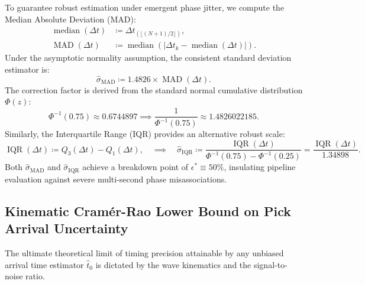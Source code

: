 To guarantee robust estimation under emergent phase jitter, we compute the
Median Absolute Deviation (\ac{MAD}):
\begin{align}
  \operatorname{median}(\Delta t)
  &\coloneqq \Delta t_{(\lfloor (N+1)/2 \rfloor)},
  \label{eq:supp_median} \\
  \operatorname{MAD}(\Delta t)
  &\coloneqq \operatorname{median}\left(\left| \Delta t_k -
  \operatorname{median}(\Delta t) \right|\right).
  \label{eq:supp_mad}
\end{align}
Under the asymptotic normality assumption, the consistent standard
deviation estimator is:
\begin{equation}
  \hat{\sigma}_{\mathrm{MAD}} \coloneqq \num{1.4826} \times
  \operatorname{MAD}(\Delta t).
  \label{eq:supp_sigma_mad}
\end{equation}
The correction factor is derived from the standard normal cumulative
distribution $\Phi(z)$:
\begin{equation}
  \Phi^{-1}(\num{0.75}) \approx \num{0.6744897} \implies
  \frac{1}{\Phi^{-1}(\num{0.75})} \approx \num{1.4826022185}.
  \label{eq:supp_mad_factor_derivation}
\end{equation}
Similarly, the Interquartile Range (\ac{IQR}) provides an
alternative robust scale:
\begin{equation}
  \operatorname{IQR}(\Delta t) \coloneqq Q_3(\Delta t) - Q_1(\Delta t),
  \quad \implies \quad
  \hat{\sigma}_{\mathrm{IQR}} \coloneqq
  \frac{\operatorname{IQR}(\Delta t)}{\Phi^{-1}(\num{0.75}) -
  \Phi^{-1}(\num{0.25})}
  = \frac{\operatorname{IQR}(\Delta t)}{\num{1.34898}}.
  \label{eq:supp_sigma_iqr}
\end{equation}
Both $\hat{\sigma}_{\mathrm{MAD}}$ and $\hat{\sigma}_{\mathrm{IQR}}$
achieve a breakdown
point of $\epsilon^* \equiv \num{50}\%$, insulating pipeline
evaluation against severe
multi-second phase misassociations.


\subsection*{Kinematic Cramér-Rao Lower Bound on Pick Arrival Uncertainty}
\label{subsec:supp_cramer_rao}

The ultimate theoretical limit of timing precision attainable by any
unbiased arrival
time estimator $\hat{t}_0$ is dictated by the wave kinematics and
the signal-to-noise ratio.

